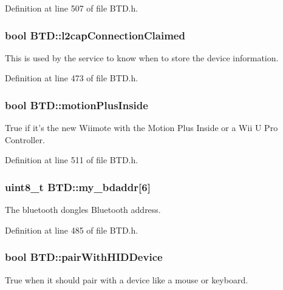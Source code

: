 \-Definition at line 507 of file \-B\-T\-D.\-h.

\hypertarget{class_b_t_d_a0f1c28a03bcbe62cc7c083f97ea27594}{
\subsubsection[{l2cap\-Connection\-Claimed}]{\setlength{\rightskip}{0pt plus 5cm}bool {\bf \-B\-T\-D\-::l2cap\-Connection\-Claimed}}}\label{class_b_t_d_a0f1c28a03bcbe62cc7c083f97ea27594}
\-This is used by the service to know when to store the device information. 

\-Definition at line 473 of file \-B\-T\-D.\-h.

\hypertarget{class_b_t_d_a3aea445b2349e99ef057db1a4ffdd9dc}{
\subsubsection[{motion\-Plus\-Inside}]{\setlength{\rightskip}{0pt plus 5cm}bool {\bf \-B\-T\-D\-::motion\-Plus\-Inside}}}\label{class_b_t_d_a3aea445b2349e99ef057db1a4ffdd9dc}
\-True if it's the new \-Wiimote with the \-Motion \-Plus \-Inside or a \-Wii \-U \-Pro \-Controller. 

\-Definition at line 511 of file \-B\-T\-D.\-h.

\hypertarget{class_b_t_d_a1f8e9171a310e50f2c4a3c19066efe5a}{
\subsubsection[{my\-\_\-bdaddr}]{\setlength{\rightskip}{0pt plus 5cm}uint8\-\_\-t {\bf \-B\-T\-D\-::my\-\_\-bdaddr}\mbox{[}6\mbox{]}}}\label{class_b_t_d_a1f8e9171a310e50f2c4a3c19066efe5a}
\-The bluetooth dongles \-Bluetooth address. 

\-Definition at line 485 of file \-B\-T\-D.\-h.

\hypertarget{class_b_t_d_a2aa418d820fb6b877ea079e0436a518e}{
\subsubsection[{pair\-With\-H\-I\-D\-Device}]{\setlength{\rightskip}{0pt plus 5cm}bool {\bf \-B\-T\-D\-::pair\-With\-H\-I\-D\-Device}}}\label{class_b_t_d_a2aa418d820fb6b877ea079e0436a518e}
\-True when it should pair with a device like a mouse or keyboard. 

